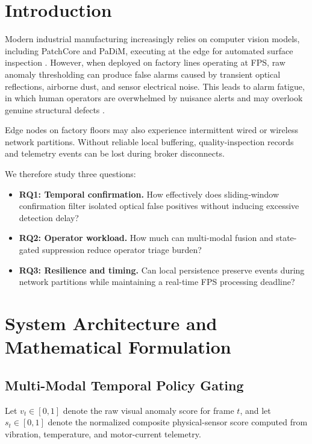 \documentclass[conference]{IEEEtran}
\begin{document}
\section{Introduction}

Modern industrial manufacturing increasingly relies on computer vision models, including PatchCore and PaDiM, executing at the edge for automated surface inspection \cite{roth2022patchcore}. However, when deployed on factory lines operating at \TargetFPS{} FPS, raw anomaly thresholding can produce false alarms caused by transient optical reflections, airborne dust, and sensor electrical noise. This leads to alarm fatigue, in which human operators are overwhelmed by nuisance alerts and may overlook genuine structural defects \cite{chen2021edge}.

Edge nodes on factory floors may also experience intermittent wired or wireless network partitions. Without reliable local buffering, quality-inspection records and telemetry events can be lost during broker disconnects.

We therefore study three questions:
\begin{itemize}
    \item \textbf{RQ1: Temporal confirmation.} How effectively does sliding-window confirmation filter isolated optical false positives without inducing excessive detection delay?
    \item \textbf{RQ2: Operator workload.} How much can multi-modal fusion and state-gated suppression reduce operator triage burden?
    \item \textbf{RQ3: Resilience and timing.} Can local persistence preserve events during network partitions while maintaining a real-time \TargetFPS{} FPS processing deadline?
\end{itemize}

\section{System Architecture and Mathematical Formulation}

\subsection{Multi-Modal Temporal Policy Gating}
Let $v_t \in [0,1]$ denote the raw visual anomaly score for frame $t$, and let $s_t \in [0,1]$ denote the normalized composite physical-sensor score computed from vibration, temperature, and motor-current telemetry.
\end{document}

